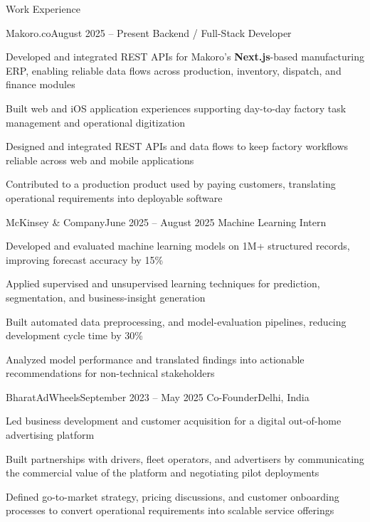 \documentclass{resume}
\begin{document}
\begin{rSection}{Work Experience}
\begin{rSubsection}{Makoro.co}{August 2025 -- Present}
{Backend / Full-Stack Developer}{}
\item Developed and integrated REST APIs for Makoro's \textbf{Next.js}-based manufacturing ERP, enabling reliable data flows across production, inventory, dispatch, and finance modules
\item Built web and iOS application experiences supporting day-to-day factory task management and operational digitization
\item Designed and integrated REST APIs and data flows to keep factory workflows reliable across web and mobile applications
\item Contributed to a production product used by paying customers, translating operational requirements into deployable software
\end{rSubsection}

\begin{rSubsection}{McKinsey \& Company}{June 2025 -- August 2025}
{Machine Learning Intern}{}
\item Developed and evaluated machine learning models on 1M+ structured records, improving forecast accuracy by 15\%
\item Applied supervised and unsupervised learning techniques for prediction, segmentation, and business-insight generation
\item Built automated data preprocessing, and model-evaluation pipelines, reducing development cycle time by 30\%
\item Analyzed model performance and translated findings into actionable recommendations for non-technical stakeholders
\end{rSubsection}

\begin{rSubsection}{BharatAdWheels}{September 2023 -- May 2025}
{Co-Founder}{Delhi, India}
\item Led business development and customer acquisition for a digital out-of-home advertising platform
\item Built partnerships with drivers, fleet operators, and advertisers by communicating the commercial value of the platform and negotiating pilot deployments
\item Defined go-to-market strategy, pricing discussions, and customer onboarding processes to convert operational requirements into scalable service offerings
\end{rSubsection}


\end{rSection}
\end{document}
